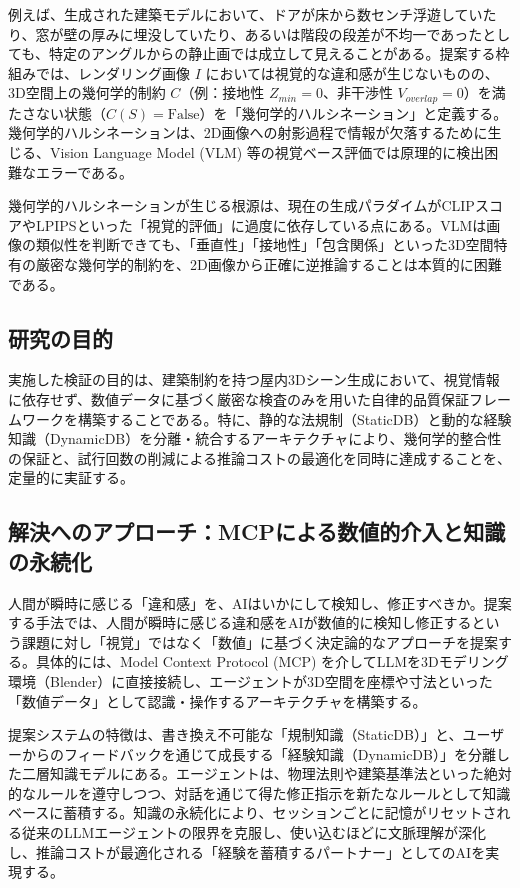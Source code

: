 \documentclass[dvipdfmx, a4paper, 9pt]{deimj}
\begin{document}
例えば、生成された建築モデルにおいて、ドアが床から数センチ浮遊していたり、窓が壁の厚みに埋没していたり、あるいは階段の段差が不均一であったとしても、特定のアングルからの静止画では成立して見えることがある。提案する枠組みでは、レンダリング画像 $I$ においては視覚的な違和感が生じないものの、3D空間上の幾何学的制約 $C$（例：接地性 $Z_{min}=0$、非干渉性 $V_{overlap}=0$）を満たさない状態（$C(S) = \text{False}$）を「幾何学的ハルシネーション」と定義する。幾何学的ハルシネーションは、2D画像への射影過程で情報が欠落するために生じる、Vision Language Model (VLM) 等の視覚ベース評価では原理的に検出困難なエラーである。

幾何学的ハルシネーションが生じる根源は、現在の生成パラダイムがCLIPスコア\cite{radford2021clip}やLPIPS\cite{zhang2018lpips}といった「視覚的評価」に過度に依存している点にある。VLMは画像の類似性を判断できても、「垂直性」「接地性」「包含関係」といった3D空間特有の厳密な幾何学的制約を、2D画像から正確に逆推論することは本質的に困難である。

\subsection{研究の目的}

実施した検証の目的は、建築制約を持つ屋内3Dシーン生成において、視覚情報に依存せず、数値データに基づく厳密な検査のみを用いた自律的品質保証フレームワークを構築することである。特に、静的な法規制（StaticDB）と動的な経験知識（DynamicDB）を分離・統合するアーキテクチャにより、幾何学的整合性の保証と、試行回数の削減による推論コストの最適化を同時に達成することを、定量的に実証する。

\subsection{解決へのアプローチ：MCPによる数値的介入と知識の永続化}

人間が瞬時に感じる「違和感」を、AIはいかにして検知し、修正すべきか。提案する手法では、人間が瞬時に感じる違和感をAIが数値的に検知し修正するという課題に対し「視覚」ではなく「数値」に基づく決定論的なアプローチを提案する。具体的には、Model Context Protocol (MCP)\cite{anthropic2024mcp} を介してLLMを3Dモデリング環境（Blender）に直接接続し、エージェントが3D空間を座標や寸法といった「数値データ」として認識・操作するアーキテクチャを構築する。

提案システムの特徴は、書き換え不可能な「規制知識（StaticDB）」と、ユーザーからのフィードバックを通じて成長する「経験知識（DynamicDB）」を分離した二層知識モデルにある。エージェントは、物理法則や建築基準法といった絶対的なルールを遵守しつつ、対話を通じて得た修正指示を新たなルールとして知識ベースに蓄積する。知識の永続化により、セッションごとに記憶がリセットされる従来のLLMエージェントの限界を克服し、使い込むほどに文脈理解が深化し、推論コストが最適化される「経験を蓄積するパートナー」としてのAIを実現する。
\end{document}
